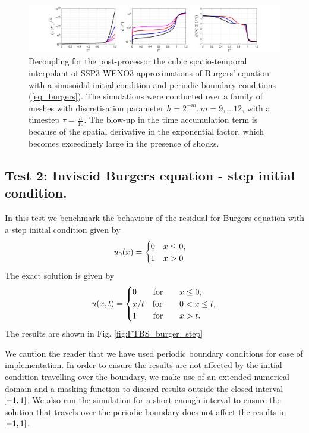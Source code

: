 \documentclass[final]{amsart}
\numberwithin{equation}{section}
\begin{document}
\begin{figure}[H]	
		\includegraphics[width=\textwidth]{../figures/fig_SSP3WENO3_postshockplots_1x5_sin_IC_burgers_decoupled}	
	\caption{\label{fig:SSP3WENO_burgers_decoupled}  Decoupling for the post-processor the cubic spatio-temporal  interpolant of SSP3-WENO3
		approximations of Burgers' equation with a sinusoidal initial condition and periodic boundary conditions
		(\ref{eq_burgers}).  The simulations were conducted over a family of
		meshes with discretisation parameter $h = 2^{-m}, m = 9,\dots 12$,
		with a timestep $\tau = \tfrac{h}{10}$. The blow-up in the time accumulation term is because of the spatial derivative in the exponential factor, which becomes exceedingly large in the presence of shocks. }
\end{figure}

\subsection{Test 2: Inviscid Burgers equation - step initial condition.}  In this test we benchmark the behaviour of the residual for Burgers equation with a step initial condition given by 
\begin{equation}\label{eq:burrger_disc_ic}
\begin{aligned}
u_0\!\left({x}\right)
=
\begin{cases}
0\quad x\leq 0,\\
1\quad x>0
\end{cases}
\end{aligned}
\end{equation}
The exact solution is given by 
\begin{equation}
\begin{aligned}
u\!\left({x,t}\right)
=
\begin{cases}
0\quad \quad \text{for}\quad &x\leq 0,\\
x/t\quad \text{for}\quad &0<x\leq t,\\
1\quad \quad \text{for}\quad &x>t.
\end{cases}
\end{aligned}
\end{equation}
The results are shown in Fig. \ref{fig:FTBS_burger_step}
\begin{Rem} We caution the reader that we have used periodic boundary conditions for ease of implementation.  In order to ensure the results are not affected by the initial condition travelling over the boundary, we make use of an extended numerical domain and a masking function to discard results outside the closed interval $\!\left[{-1,1}\right]$. We also run the simulation for a short enough interval to ensure the solution that travels over the periodic boundary does not affect the results in $\!\left[{-1,1}\right]$.
\end{Rem}
\end{document}
